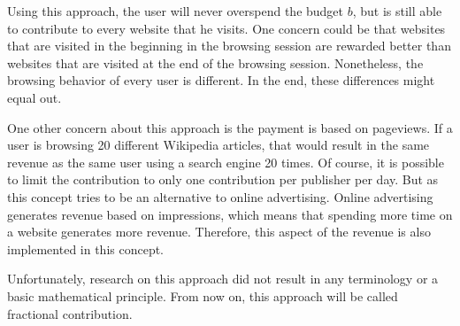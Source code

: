 Using this approach, the user will never overspend the budget $b$, but is still able to contribute to every website that he visits. One concern could be that websites that are visited in the beginning in the browsing session are rewarded better than websites that are visited at the end of the browsing session. Nonetheless, the browsing behavior of every user is different. In the end, these differences might equal out.

One other concern about this approach is the payment is based on pageviews. If a user is browsing 20 different Wikipedia articles, that would result in the same revenue as the same user using a search engine 20 times. Of course, it is possible to limit the contribution to only one contribution per publisher per day. But as this concept tries to be an alternative to online advertising. Online advertising generates revenue based on impressions, which means that spending more time on a website generates more revenue. Therefore, this aspect of the revenue is also implemented in this concept. 

Unfortunately, research on this approach did not result in any terminology or a basic mathematical principle. From now on, this approach will be called fractional contribution. 
